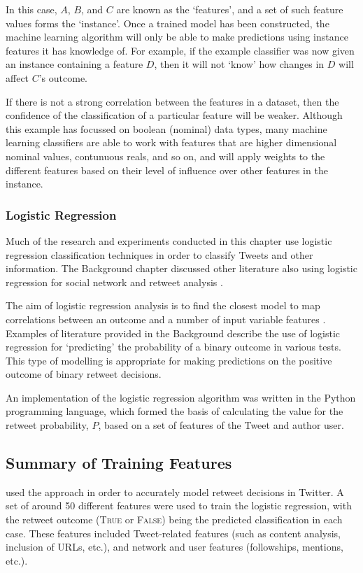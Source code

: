 In this case, $A$, $B$, and $C$ are known as the `features', and a set of such feature values forms the `instance'. Once a trained model has been constructed, the machine learning algorithm will only be able to make predictions using instance features it has knowledge of. For example, if the example classifier was now given an instance containing a feature $D$, then it will not `know' how changes in $D$ will affect $C$'s outcome.

If there is not a strong correlation between the features in a dataset, then the confidence of the classification of a particular feature will be weaker. Although this example has focussed on boolean (nominal) data types, many machine learning classifiers are able to work with features that are higher dimensional nominal values, contunuous reals, and so on, and will apply weights to the different features based on their level of influence over other features in the instance.


\subsubsection{Logistic Regression}
\label{section:logistic_regression}
Much of the research and experiments conducted in this chapter use logistic regression classification techniques in order to classify Tweets and other information. The Background chapter discussed other literature also using logistic regression for social network and retweet analysis \cite{castillo11} \cite{zhu11} \cite{peng11} \cite{naveed11} \cite{hong11}.

The aim of logistic regression analysis is to find the closest model to map correlations between an outcome and a number of input variable features \cite{hosmer13}. Examples of literature provided in the Background describe the use of logistic regression for `predicting' the probability of a binary outcome in various tests. This type of modelling is appropriate for making predictions on the positive outcome of binary retweet decisions.

An implementation of the logistic regression algorithm was written in the Python programming language, which formed the basis of calculating the value for the retweet probability, $P$, based on a set of features of the Tweet and author user.


\subsection{Summary of Training Features}
\cite{zhu11} used the approach in order to accurately model retweet decisions in Twitter. A set of around 50 different features were used to train the logistic regression, with the retweet outcome (\textsc{True} or \textsc{False}) being the predicted classification in each case. These features included Tweet-related features (such as content analysis, inclusion of URLs, etc.), and network and user features (followships, mentions, etc.).

